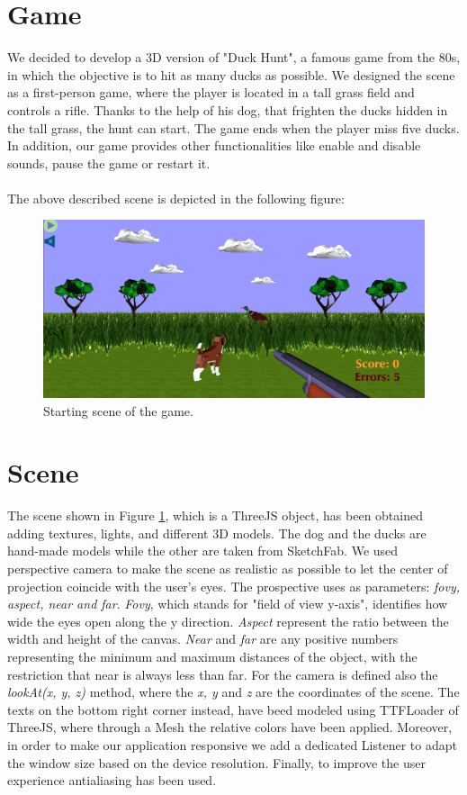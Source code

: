 \documentclass[12pt,a4paper]{article}
\begin{document}
\section{Game}
We decided to develop a 3D version of "Duck Hunt", a  
famous game from the 80s, in which the objective is to hit  
as many ducks as possible. We designed the
scene as a first-person game, where the player is located 
in a tall grass field and controls a rifle. 
Thanks to the help of his dog, that frighten the ducks hidden 
in the tall grass, the hunt can start. 
The game ends when the player miss five ducks.
In addition, our game provides other functionalities like enable 
and disable sounds, pause the game or restart it.
\\ \\The above described scene is depicted in the following figure:
\begin{figure}[hbt!]
    \centering
    \includegraphics[width=1\textwidth]{game.png}
    \caption{Starting scene of the game.}
    \label{fig1}
\end{figure}
\section{Scene}
The scene shown in Figure \ref{fig1}, which is a ThreeJS object, 
has been obtained adding textures, lights, and different 3D models. 
The dog and the ducks are hand-made models while the other are 
taken from SketchFab. We used perspective camera to make the scene 
as realistic as possible to let the center of projection coincide 
with the user’s eyes.
The prospective uses as parameters: \textit{fovy, aspect, near and 
far}. \textit{Fovy}, which stands for "field of view y-axis",
identifies how wide the eyes open along the y direction.
\textit{Aspect} represent the ratio between the width and height
of the canvas.
\textit{Near} and \textit{far} are any positive numbers 
representing the minimum and maximum distances of the object, 
with the restriction that near is always less than far.
For the camera is defined also the  
\textit{lookAt(x, y, z)} method, where the \textit{x, y} and \textit{z} 
are the coordinates of the scene.
The texts on the bottom right corner instead, have beed modeled using
TTFLoader of ThreeJS, where through a Mesh the relative 
colors have been applied.
Moreover, in order to make our application responsive we add a 
dedicated Listener to adapt the window size based on the device
resolution. Finally, to improve the user experience antialiasing 
has been used.
\end{document}
